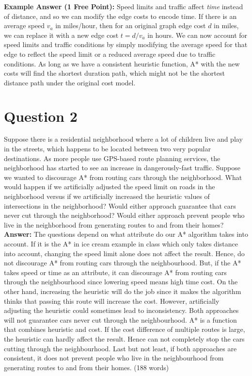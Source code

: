 \documentclass[12pt]{extarticle}
\begin{document}
\noindent\textbf{Example Answer (1 Free Point):} Speed limits and traffic affect \emph{time} instead of distance, and so we can modify the edge costs to encode time. If there is an average speed $v_a$ in miles/hour, then for an original graph edge cost $d$ in miles, we can replace it with a new edge cost $t = d/v_a$ in hours. We can now account for speed limits and traffic conditions by simply modifying the average speed for that edge to reflect the speed limit or a reduced average speed due to traffic conditions. As long as we have a consistent heuristic function, A* with the new costs will find the shortest duration path, which might not be the shortest distance path under the original cost model.

\newpage
\section*{Question 2}

Suppose there is a residential neighborhood where a lot of children live and play in the streets, which happens to be located between two very popular destinations. As more people use GPS-based route planning services, the neighborhood has started to see an increase in dangerously-fast traffic. Suppose we wanted to discourage A* from routing cars through the neighborhood. What would happen if we artificially adjusted the speed limit on roads in the neighborhood versus if we artificially increased the heuristic values of intersections in the neighborhood?   Would either approach guarantee that cars never cut through the neighborhood? Would either approach prevent people who live in the neighborhood from generating routes to and from their homes? \\

\noindent\textbf{Answer:} The questions depend on what attribute do our A* algorithm takes into account. If it is the A* in ice cream example in class which only takes distance into account, changing the speed limit alone does not affect the result. Hence, do not discourage A* from routing cars through the neighbourhood. But, if the A* takes speed or time as an attribute, it can discourage A* from routing cars through the neighbourhood since lowering speed means high time cost. On the other hand, increasing the heuristic will do the job since it makes the algorithm thinks that passing this route will increase the cost. However, artificially adjusting the heuristic could sometimes lead to inconsistency. Both approaches will not guarantee cars never cut through the neighbourhood. A* is a function that combines heuristic and cost. If the cost difference of multiple routes is large, the heuristic can hardly affect the result. Hence can not completely stop the cars cutting through the neighbourhood. Last but not least, if both approaches are consistent, it does not prevent people who live in the neighbourhood from generating routes to and from their homes. (188 words)
\end{document}
